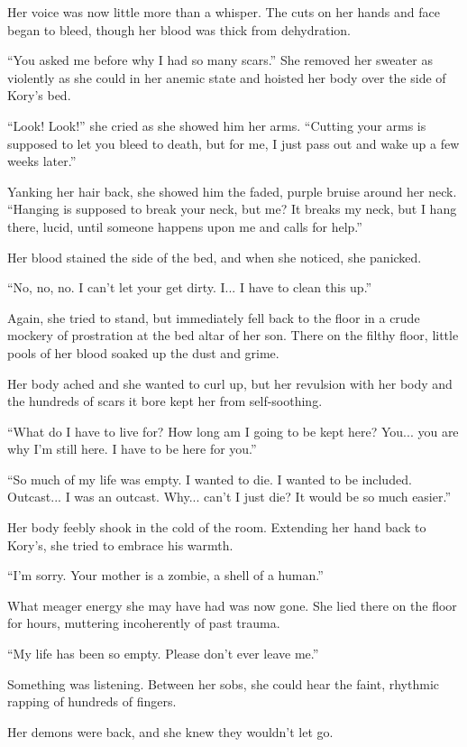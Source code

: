 Her voice was now little more than a whisper. The cuts on her hands and face began to bleed, though her blood was thick from dehydration.

``You asked me before why I had so many scars.'' She removed her sweater as violently as she could in her anemic state and hoisted her body over the side of Kory's bed.

``Look! Look!'' she cried as she showed him her arms. ``Cutting your arms is supposed to let you bleed to death, but for me, I just pass out and wake up a few weeks later.''

Yanking her hair back, she showed him the faded, purple bruise around her neck. ``Hanging is supposed to break your neck, but me? It breaks my neck, but I hang there, lucid, until someone happens upon me and calls for help.''

Her blood stained the side of the bed, and when she noticed, she panicked.

``No, no, no. I can't let your get dirty. I... I have to clean this up.''

Again, she tried to stand, but immediately fell back to the floor in a crude mockery of prostration at the bed altar of her son. There on the filthy floor, little pools of her blood soaked up the dust and grime.

Her body ached and she wanted to curl up, but her revulsion with her body and the hundreds of scars it bore kept her from self-soothing.

``What do I have to live for? How long am I going to be kept here? You... you are why I'm still here. I have to be here for you.''

``So much of my life was empty. I wanted to die. I wanted to be included. Outcast... I was an outcast. Why... can't I just die? It would be so much easier.''

Her body feebly shook in the cold of the room. Extending her hand back to Kory's, she tried to embrace his warmth.

``I'm sorry. Your mother is a zombie, a shell of a human.''

What meager energy she may have had was now gone. She lied there on the floor for hours, muttering incoherently of past trauma.

``My life has been so empty. Please don't ever leave me.''

Something was listening. Between her sobs, she could hear the faint, rhythmic rapping of hundreds of fingers.

Her demons were back, and she knew they wouldn't let go.

\line


